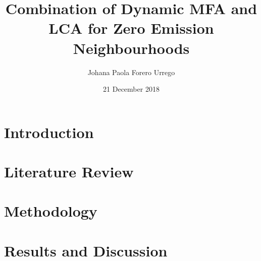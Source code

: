 \documentclass[a4paper,11pt]{report}
\title{Combination of Dynamic MFA and LCA for Zero Emission Neighbourhoods}
\author{Johana Paola Forero Urrego}
\date{21 December 2018}
\begin{document}
\maketitle

\tableofcontents
\chapter{Introduction}


\chapter{Literature Review}


\chapter{Methodology}



\chapter{Results and Discussion}

\end{document}
